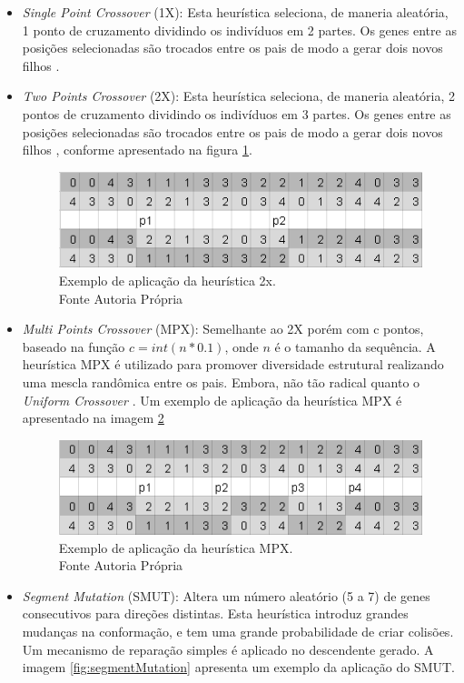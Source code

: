  \begin{itemize}
 	
 		\item \textit{Single Point Crossover} (1X): Esta heurística seleciona, de maneria aleatória, 1 ponto de cruzamento dividindo os indivíduos em 2 partes. Os genes entre as posições selecionadas são trocados entre os pais de modo a gerar dois novos filhos \cite{benitez2015algoritmo}.
 	
 	\item \textit{Two Points Crossover} (2X): Esta heurística seleciona, de maneria aleatória, 2 pontos de cruzamento dividindo os indivíduos em 3 partes. Os genes entre as posições selecionadas são trocados entre os pais de modo a gerar dois novos filhos \cite{benitez2015algoritmo}, conforme apresentado na figura \ref{fig:twopointscrossover}.
 	
 	
 	\begin{figure}[!htb]
 		\centering
 		\includegraphics{Imagens/TwoPointsCrossover.png}
 		\caption{Exemplo de aplicação da heurística 2x. \\Fonte Autoria Própria}
 		\label{fig:twopointscrossover}
 	\end{figure}
 	
 	
 	
 	
 	\item \textit{Multi Points Crossover} (MPX): Semelhante ao 2X porém com c pontos, baseado na função $c = int(n * 0.1)$, onde $n$ é o tamanho da sequência. A heurística MPX é utilizado para promover diversidade estrutural realizando uma mescla randômica entre os pais. Embora, não tão radical quanto o \textit{Uniform  Crossover} \cite{sabar2015automatic}. Um exemplo de aplicação da heurística MPX é apresentado na imagem \ref{fig:multipointscrossover}
 	
 	
 	\begin{figure}[!htb]
 		\centering
 		\includegraphics{Imagens/MultiPointsCrossover.png}
 		\caption{Exemplo de aplicação da heurística MPX. \\Fonte Autoria Própria}
 		\label{fig:multipointscrossover}
 	\end{figure}
 	\item \textit{Segment Mutation} (SMUT): Altera um número aleatório (5 a 7) de genes consecutivos para direções distintas. Esta heurística introduz grandes mudanças na conformação, e tem uma grande probabilidade de criar colisões. Um mecanismo de reparação simples é aplicado no descendente gerado. A imagem \ref{fig:segmentMutation} apresenta um exemplo da aplicação do SMUT.
 	

\end{itemize}
